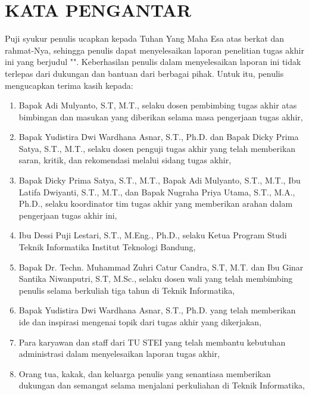 \chapter*{\MakeUppercase{Kata Pengantar}}

Puji syukur penulis ucapkan kepada Tuhan Yang Maha Esa atas berkat dan rahmat-Nya, sehingga penulis dapat menyelesaikan laporan penelitian tugas akhir ini yang berjudul "{\thetitle}". Keberhasilan penulis dalam menyelesaikan laporan ini tidak terlepas dari dukungan dan bantuan dari berbagai pihak. Untuk itu, penulis mengucapkan terima kasih kepada:

\begin{enumerate}
  \item Bapak Adi Mulyanto, S.T, M.T., selaku dosen pembimbing tugas akhir atas bimbingan dan masukan yang diberikan selama masa pengerjaan tugas akhir,
   
  \item Bapak Yudistira Dwi Wardhana Asnar, S.T., Ph.D. dan Bapak Dicky Prima Satya, S.T., M.T., selaku dosen penguji tugas akhir yang telah memberikan saran, kritik, dan rekomendasi melalui sidang tugas akhir,
   
  \item Bapak Dicky Prima Satya, S.T., M.T., Bapak Adi Mulyanto, S.T., M.T., Ibu Latifa Dwiyanti, S.T., M.T., dan Bapak Nugraha Priya Utama, S.T., M.A., Ph.D., selaku koordinator tim tugas akhir yang memberikan arahan dalam pengerjaan tugas akhir ini,

  \item Ibu Dessi Puji Lestari, S.T., M.Eng., Ph.D., selaku Ketua Program Studi Teknik Informatika Institut Teknologi Bandung,
   
  \item Bapak Dr. Techn. Muhammad Zuhri Catur Candra, S.T, M.T. dan Ibu Ginar Santika Niwanputri, S.T, M.Sc., selaku dosen wali yang telah membimbing penulis selama berkuliah tiga tahun di Teknik Informatika,
  
  \item Bapak Yudistira Dwi Wardhana Asnar, S.T., Ph.D. yang telah memberikan ide dan inspirasi mengenai topik dari tugas akhir yang dikerjakan, 
  
  \item Para karyawan dan staff dari TU STEI yang telah membantu kebutuhan administrasi dalam menyelesaikan laporan tugas akhir,
  
  \item Orang tua, kakak, dan keluarga penulis yang senantiasa memberikan dukungan dan semangat selama menjalani perkuliahan di Teknik Informatika,


\end{enumerate}
